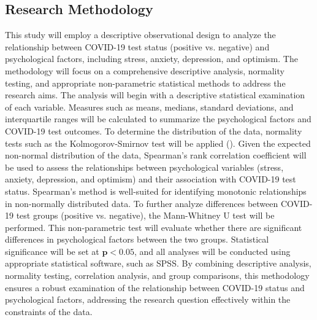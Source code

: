 \documentclass[a4paper]{article}
\begin{document}
\vspace{1em}
\subsection{Research Methodology}
\vspace{0.5em}
This study will employ a descriptive observational design to analyze the relationship between COVID-19 test status (positive vs. negative) and psychological factors,
including stress, anxiety, depression, and optimism.
\vspace{0.5em}\newline
The methodology will focus on a comprehensive descriptive analysis, normality testing, and appropriate non-parametric statistical methods to address the research aims.
The analysis will begin with a descriptive statistical examination of each variable. Measures such as means, medians, standard deviations, and interquartile ranges will be calculated to summarize the psychological factors and COVID-19 test outcomes.
To determine the distribution of the data, normality tests such as the Kolmogorov-Smirnov test will be applied (\citet{sheskin2011}).
\vspace{0.5em}\newline
Given the expected non-normal distribution of the data, Spearman’s rank correlation coefficient will be used to assess the relationships between psychological variables (stress, anxiety, depression, and optimism) and their association with COVID-19 test status.
Spearman’s method is well-suited for identifying monotonic relationships in non-normally distributed data.
\vspace{0.5em}\newline
To further analyze differences between COVID-19 test groups (positive vs. negative), the Mann-Whitney U test will be performed. This non-parametric test will evaluate whether there are significant differences in psychological factors between the two groups. Statistical significance will be set at 
\(\boldsymbol{p < 0.05 }\), and all analyses will be conducted using appropriate statistical software, such as SPSS.
\vspace{0.5em}\newline
By combining descriptive analysis, normality testing, correlation analysis, and group comparisons, this methodology ensures a robust examination of the relationship between COVID-19 status and psychological factors, addressing the research question effectively within the constraints of the data.
\end{document}
